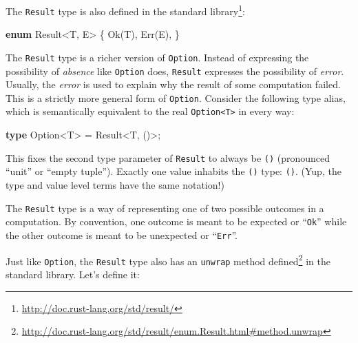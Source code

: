\documentclass[a4paper,]{book}
\newenvironment{Shaded}{\begin{snugshade}}{\end{snugshade}}
\newcommand{\KeywordTok}[1]{\textcolor[rgb]{0.13,0.29,0.53}{\textbf{{#1}}}}
\newcommand{\DataTypeTok}[1]{\textcolor[rgb]{0.13,0.29,0.53}{{#1}}}
\newcommand{\ConstantTok}[1]{\textcolor[rgb]{0.00,0.00,0.00}{{#1}}}
\newcommand{\NormalTok}[1]{{#1}}
\renewcommand{\href}[2]{#2\footnote{\url{#1}}}
\begin{document}

The \texttt{Result} type is also
\href{http://doc.rust-lang.org/std/result/}{defined in the standard
library}:


\begin{Shaded}
\begin{Highlighting}[]
\KeywordTok{enum} \DataTypeTok{Result}\NormalTok{<T, E> \{}
    \ConstantTok{Ok}\NormalTok{(T),}
    \ConstantTok{Err}\NormalTok{(E),}
\NormalTok{\}}
\end{Highlighting}
\end{Shaded}

The \texttt{Result} type is a richer version of \texttt{Option}. Instead
of expressing the possibility of \emph{absence} like \texttt{Option}
does, \texttt{Result} expresses the possibility of \emph{error}.
Usually, the \emph{error} is used to explain why the result of some
computation failed. This is a strictly more general form of
\texttt{Option}. Consider the following type alias, which is
semantically equivalent to the real
\texttt{Option\textless{}T\textgreater{}} in every way:

\begin{Shaded}
\begin{Highlighting}[]
\KeywordTok{type} \NormalTok{Option<T> = }\DataTypeTok{Result}\NormalTok{<T, ()>;}
\end{Highlighting}
\end{Shaded}

This fixes the second type parameter of \texttt{Result} to always be
\texttt{()} (pronounced ``unit'' or ``empty tuple''). Exactly one value
inhabits the \texttt{()} type: \texttt{()}. (Yup, the type and value
level terms have the same notation!)

The \texttt{Result} type is a way of representing one of two possible
outcomes in a computation. By convention, one outcome is meant to be
expected or ``\texttt{Ok}'' while the other outcome is meant to be
unexpected or ``\texttt{Err}''.

Just like \texttt{Option}, the \texttt{Result} type also has an
\href{http://doc.rust-lang.org/std/result/enum.Result.html\#method.unwrap}{\texttt{unwrap}
method defined} in the standard library. Let's define it:
\end{document}

